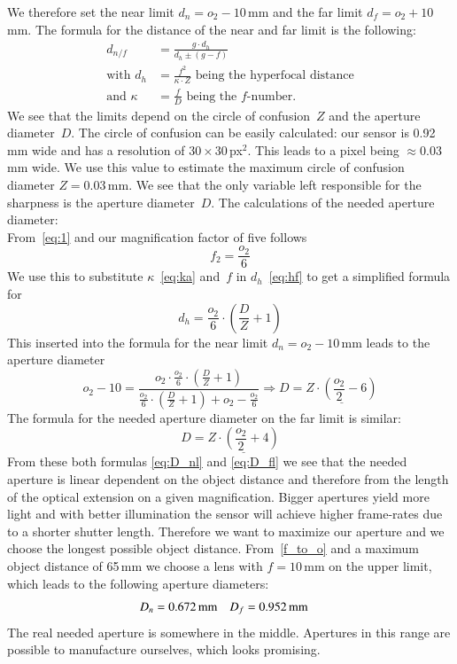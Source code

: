 \documentclass[12pt,a4paper]{article}
\begin{document}
We therefore set the near limit $d_n = o_2 - 10$\,mm and the far limit $d_f = o_2 + 10$\,mm.
The formula for the distance of the near and far limit is the following: %
\begin{align}
\label{eq:nf}
d_{n/f} &= \frac{g \cdot d_h}{d_h \pm (g-f)} \\
\label{eq:hf}\text{with } d_h &= \frac{f^2}{\kappa \cdot Z} \text{ being the hyperfocal distance}\\
\label{eq:ka}\text{and } \kappa &= \frac{f}{D} \text{ being the $f$-number.}
\end{align}
We see that the limits depend on the circle of confusion~$Z$ and the aperture diameter~$D$.
The circle of confusion can be easily calculated: our sensor is 0.92\,mm wide and has a resolution of $30 \times 30$\,px$^2$.
This leads to a pixel being $\approx 0.03$\,mm wide.
We use this value to estimate the maximum circle of confusion diameter $Z = 0.03$\,mm.
We see that the only variable left responsible for the sharpness is the aperture diameter~$D$.
The calculations of the needed aperture diameter:\\
From~\autoref{eq:1} and our magnification factor of five follows
\begin{equation}
\label{f_to_o}
f_2 = \frac{o_2}{6}
\end{equation}
We use this to substitute $\kappa$~\eqref{eq:ka} and~$f$ in $d_h$~\eqref{eq:hf} to get a simplified formula for
\begin{equation}
d_h = \frac{o_2}{6} \cdot \left( {\frac{D}{Z} + 1 } \right)
\end{equation}
This inserted into the formula for the near limit $d_n = o_2 - 10$\,mm leads to the aperture diameter
\begin{equation}
\label{eq:D_nl}
o_2 - 10 = \frac{o_2 \cdot \frac{o_2}{6} \cdot \left( { \frac{D}{Z} + 1} \right) }{ \frac{o_2}{6} \cdot \left( { \frac{D}{Z} + 1} \right) + o_2  - \frac{o_2}{6} } \Rightarrow D = \underline{Z \cdot \left( { \frac{o_2}{2} -6} \right)}
\end{equation}
The formula for the needed aperture diameter on the far limit is similar:
\begin{equation}
\label{eq:D_fl}
D = \underline{Z \cdot \left(\frac{o_2}{2} +4 \right)}
\end{equation}
From these both formulas \eqref{eq:D_nl} and \eqref{eq:D_fl} we see that the needed aperture is linear dependent on the object distance and therefore from the length of the optical extension on a given magnification.
Bigger apertures yield more light and with better illumination the sensor will achieve higher frame-rates due to a shorter shutter length.
Therefore we want to maximize our aperture and we choose the longest possible object distance.
From~\eqref{f_to_o} and a maximum object distance of 65\,mm we choose a lens with $f=10$\,mm on the upper limit, which leads to the following aperture diameters:
\begin{align*}
D_n &= \unit[0.672]{mm} & D_f &= \unit[0.952]{mm}
\end{align*}
The real needed aperture is somewhere in the middle.
Apertures in this range are possible to manufacture ourselves, which looks promising.
\end{document}
